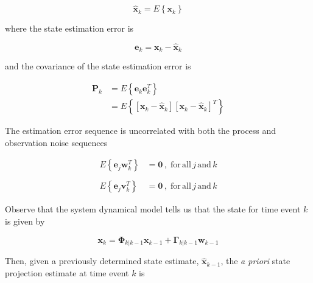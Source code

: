 \begin{equation*}
    \hat{\mathbf{x}}_k = E \left\{ \mathbf{x}_k \right\}
\end{equation*}

where the state estimation error is

\begin{equation*}
    \mathbf{e}_k = \mathbf{x}_{k} - \hat{\mathbf{x}}_k
\end{equation*}

and the covariance of the state estimation error is

\begin{equation*}
    \begin{aligned}
        \mathbf{P}_k &= E \left\{ \mathbf{e}_k \mathbf{e}_k^T \right\} \\
        &= E \left\{ \left[ \mathbf{x}_{k} - \hat{\mathbf{x}}_k \right] \left[ \mathbf{x}_{k} - \hat{\mathbf{x}}_k \right]^T \right\}
    \end{aligned}
\end{equation*}

The estimation error sequence is uncorrelated with both the process and observation noise sequences

\begin{equation*}
    \begin{aligned}
        E \left\{ \mathbf{e}_j \mathbf{w}_k^T \right\} &= \mathbf{0} \, , \phantom{.} \mathrm{for} \, \mathrm{all} \, j \, \mathrm{and} \, k \\
        \phantom{.} \\
        E \left\{ \mathbf{e}_j \mathbf{v}_k^T \right\} &= \mathbf{0} \, , \phantom{.} \mathrm{for} \, \mathrm{all} \, j \, \mathrm{and} \, k
    \end{aligned}
\end{equation*}

Observe that the system dynamical model tells us that the state for time event $k$ is given by

\begin{equation*}
    \mathbf{x}_{k} = \mathbf{\Phi}_{k|k-1} \mathbf{x}_{k-1} + \mathbf{\Gamma}_{k|k-1} \mathbf{w}_{k-1}
\end{equation*}

Then, given a previously determined state estimate, $\hat{\mathbf{x}}_{k-1}$, the
\textit{a priori} state projection estimate at time event $k$ is


